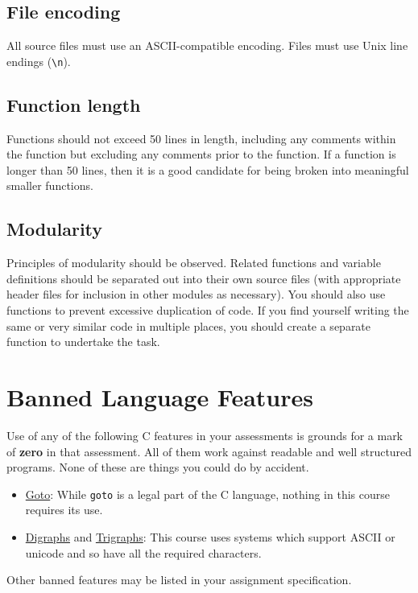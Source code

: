 \documentclass{article}
\begin{document}
\subsection{File encoding}
All source files must use an ASCII-compatible encoding. 
Files must use Unix line endings (\texttt{\textbackslash n}).

\subsection{Function length}
Functions should not exceed 50 lines in length, including any comments within the function but excluding any
comments prior to the function.
If a function is longer than 50 lines, then it is a good candidate for being broken into meaningful smaller functions.

\subsection{Modularity}
Principles of modularity should be observed.
Related functions and variable definitions should be separated out into their own source files (with appropriate header files for inclusion in other modules as necessary).
You should also use functions to prevent excessive duplication of code.
If you find yourself writing the same or very similar code in multiple places, you should create a separate function to undertake the task.

\section{Banned Language Features}
Use of any of the following C features in your assessments is grounds for a mark of \textbf{zero} in that assessment.
All of them work against readable and well structured programs.
None of these are things you could do by accident.

\begin{itemize}
\item \underline{Goto}: While \texttt{goto} is a legal part of the C language, nothing in this course requires its use.
\item \underline{Digraphs} and \underline{Trigraphs}: This course uses systems which support ASCII or unicode and so have all the required characters.
\end{itemize}

\noindent Other banned features may be listed in your assignment specification.
\end{document}
